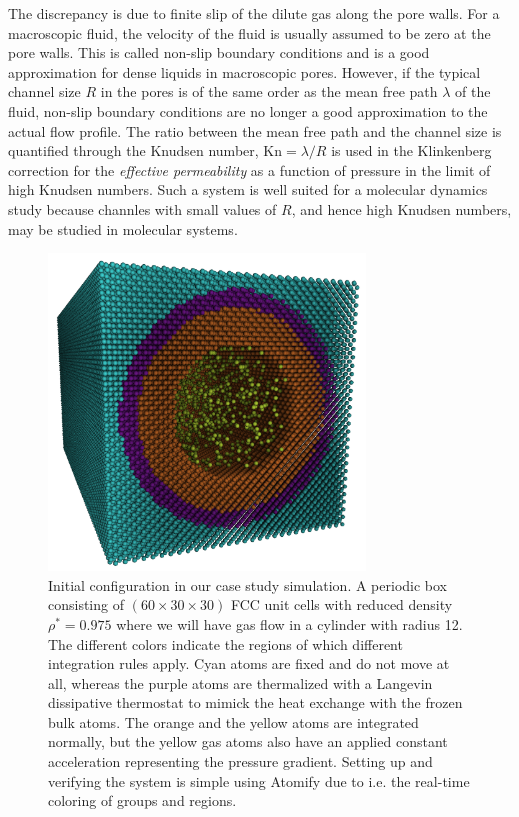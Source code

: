 \documentclass[12pt,a4paper,final]{iopart}
\begin{document}
The discrepancy is due to finite slip of the dilute gas along the pore walls. For a macroscopic fluid, the velocity of the fluid is usually assumed to be zero at the pore walls. This is called non-slip boundary conditions and is a good approximation for dense liquids in macroscopic pores. However, if the typical channel size $R$ in the pores is of the same order as the mean free path $\lambda$ of the fluid, non-slip boundary conditions are no longer a good approximation to the actual flow profile. The ratio between the mean free path and the channel size is quantified through
the Knudsen number, $\text{Kn} = \lambda / R$ is used in the Klinkenberg correction\cite{klinkenberg1941permeability} for the \textit{effective permeability} as a function of pressure in the limit of high Knudsen numbers. Such a system is well suited for a molecular dynamics study because channles with small values of $R$, and hence high Knudsen numbers, may be studied in molecular systems.

\begin{figure}
	\centering
	\includegraphics[width=0.75\textwidth]{lj_flow/configuration.png}
	\caption{
		Initial configuration in our case study simulation.
		A periodic box consisting of $(60\times30\times30)$ FCC unit cells with reduced density $\rho^* = 0.975$ where we will have gas flow in a cylinder with radius 12.
		The different colors indicate the regions of which different integration rules apply.
		Cyan atoms are fixed and do not move at all,
		whereas the purple atoms are thermalized with a Langevin\cite{schneider1978molecular} dissipative thermostat to mimick the heat exchange with the frozen bulk atoms.
		The orange and the yellow atoms are integrated normally, but the yellow gas atoms also have an applied constant acceleration representing the pressure gradient.
		Setting up and verifying the system is simple using Atomify due to i.e. the real-time coloring of groups and regions.
	}
	\label{fig:cylinder_simulation}
\end{figure}
\end{document}
